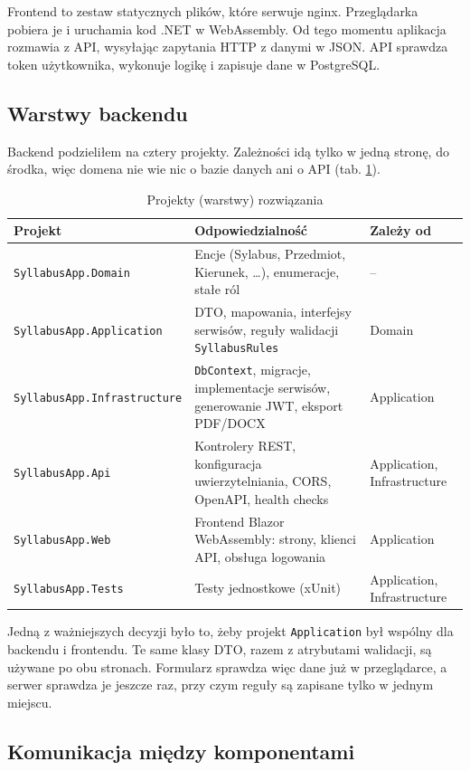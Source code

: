 \documentclass[times]{san}
\begin{document}
Frontend to zestaw statycznych plików, które serwuje nginx. Przeglądarka pobiera je i uruchamia kod .NET w WebAssembly. Od tego momentu aplikacja rozmawia z API, wysyłając zapytania HTTP z danymi w JSON. API sprawdza token użytkownika, wykonuje logikę i zapisuje dane w PostgreSQL.

\subsection{Warstwy backendu}

Backend podzieliłem na cztery projekty. Zależności idą tylko w jedną stronę, do środka, więc domena nie wie nic o bazie danych ani o API (tab. \ref{tab:warstwy}).

\begin{table}[H]
\centering
\caption{Projekty (warstwy) rozwiązania}
\label{tab:warstwy}
\small
\begin{tabularx}{\textwidth}{|l|X|l|}
\hline
\textbf{Projekt} & \textbf{Odpowiedzialność} & \textbf{Zależy od} \\
\hline
\texttt{SyllabusApp.Domain} & Encje (Sylabus, Przedmiot, Kierunek, \ldots), enumeracje, stałe ról & -- \\
\hline
\texttt{SyllabusApp.Application} & DTO, mapowania, interfejsy serwisów, reguły walidacji \texttt{SyllabusRules} & Domain \\
\hline
\texttt{SyllabusApp.Infrastructure} & \texttt{DbContext}, migracje, implementacje serwisów, generowanie JWT, eksport PDF/DOCX & Application \\
\hline
\texttt{SyllabusApp.Api} & Kontrolery REST, konfiguracja uwierzytelniania, CORS, OpenAPI, health checks & Application, Infrastructure \\
\hline
\texttt{SyllabusApp.Web} & Frontend Blazor WebAssembly: strony, klienci API, obsługa logowania & Application \\
\hline
\texttt{SyllabusApp.Tests} & Testy jednostkowe (xUnit) & Application, Infrastructure \\
\hline
\end{tabularx}
\end{table}

Jedną z ważniejszych decyzji było to, żeby projekt \texttt{Application} był wspólny dla backendu i frontendu. Te same klasy DTO, razem z atrybutami walidacji, są używane po obu stronach. Formularz sprawdza więc dane już w przeglądarce, a serwer sprawdza je jeszcze raz, przy czym reguły są zapisane tylko w jednym miejscu.

\subsection{Komunikacja między komponentami}
\end{document}
